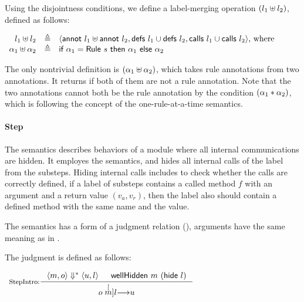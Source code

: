 Using the disjointness conditions, we define a label-merging operation
$(l_1 \uplus l_2)$, defined as follows:

\begin{definition}
  \label{def-lplus}
  \mbox{}
  \begin{center}
    \begin{math}
      \begin{array}{rcl}
        l_1 \uplus l_2 & \triangleq &
        \langle \textsf{annot}\ l_1 \uplus \textsf{annot}\ l_2, \textsf{defs}\ l_1 \cup \textsf{defs}\ l_2, \textsf{calls}\ l_1 \cup \textsf{calls}\ l_2 \rangle \textrm{, where} \\
        \alpha_1 \uplus \alpha_2 & \triangleq &
        \textsf{if}\ \alpha_1 = \textsf{Rule}\ s\ \textsf{then}\ \alpha_1\
        \textsf{else}\ \alpha_2 \\
      \end{array}
    \end{math}
  \end{center}
\end{definition}

The only nontrivial definition is $(\alpha_1 \uplus \alpha_2)$,
which takes rule annotations from two annotations. It returns
\alphameth{} if both of them are not a rule annotation. Note that the
two annotations cannot both be the rule annotation by the condition
$(\alpha_1 \ast \alpha_2)$, which is following the concept of
the one-rule-at-a-time semantics.

\paragraph{Step}
The \Step{} semantics describes behaviors of a module where all
internal communications are hidden. It employes the \Substep{}
semantics, and hides all internal calls of the label from the
substeps. Hiding internal calls includes to check whether the calls
are correctly defined, \ie{} if a label of substeps contains a called
method $f$ with an argument and a return value $(v_a, v_r)$, then the
label also should contain a defined method with the same name and the
value.

The \Step{} semantics has a form of a judgment relation
(), arguments have the same meaning as in
\Substeps{}.

\begin{definition}
  \label{def-semstep}
  The judgment  is defined as follows:
  \begin{center}
    \begin{math}
      \begin{array}{c}
        \inference[StepIntro:]{\semsss{m}{o}{u}{l} & \wellhidden{m}{(\hide{l})}}
                  {\semstep{m}{o}{u}{l}} \\
        \mbox{} \\
      \end{array}
    \end{math}
  \end{center}
\end{definition}

